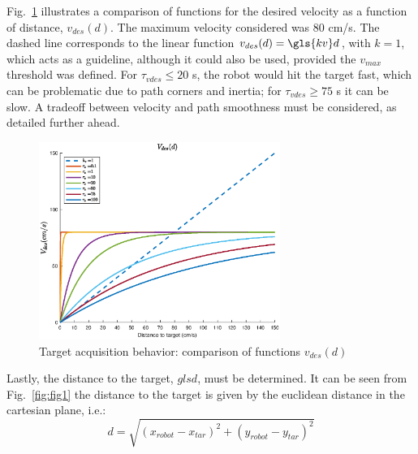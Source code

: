 Fig.~\ref{fig:linear-vel-funcs-comparison} illustrates a comparison of
functions for the desired velocity as a function of distance, $v_{des}(d)$. The
maximum velocity considered was 80 cm/s.
The dashed line corresponds to the linear function $v_{des}(d) = \gls{kv} d$, with $k
= 1$, which acts as a guideline, although it could also be used, provided the
$v_{max}$ threshold was defined. For $\tau_{vdes} \leq 20$ s, the robot would hit the
target fast, which can be problematic due to path corners and
inertia; for $\tau_{vdes} \ge 75$ s it can be
slow. A tradeoff between velocity and path smoothness must be considered, as
detailed further ahead.     
%
\begin{figure}[!hbt]
\centering
    \includegraphics[width=0.7\textwidth]{./img/linear-vel-funcs-comparison.eps}
  \caption{Target acquisition behavior: comparison of functions $v_{des} (d)$}%
\label{fig:linear-vel-funcs-comparison}
\end{figure}

Lastly, the distance to the target, $gls{d}$, must be determined. It can be seen from
Fig.~\ref{fig:fig1} the distance to the target is given by the
euclidean distance in the cartesian plane, i.e.:
\begin{equation}
  \label{eq:17}
  d = \sqrt{ (x_{robot} - x_{tar})^2 + (y_{robot} - y_{tar})^2}
\end{equation}

